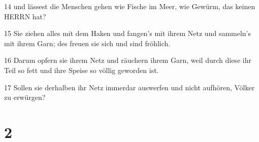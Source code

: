 \par 14 und lässest die Menschen gehen wie Fische im Meer, wie Gewürm, das keinen HERRN hat?
\par 15 Sie ziehen alles mit dem Haken und fangen's mit ihrem Netz und sammeln's mit ihrem Garn; des freuen sie sich und sind fröhlich.
\par 16 Darum opfern sie ihrem Netz und räuchern ihrem Garn, weil durch diese ihr Teil so fett und ihre Speise so völlig geworden ist.
\par 17 Sollen sie derhalben ihr Netz immerdar auswerfen und nicht aufhören, Völker zu erwürgen?

\chapter{2}

